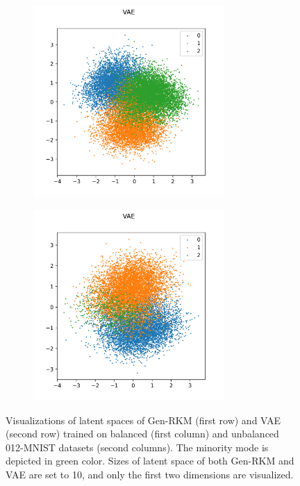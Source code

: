 \begin{figure}[H]
\begin{subfigure}{0.45\textwidth}
    \end{subfigure}
    \vfill
    \begin{subfigure}{0.45\textwidth}
        \centering
        \includegraphics[width=0.8\textwidth]{Figures/PS_v2/vae-bMNIST012-latentspace-vis.png} %
    \end{subfigure}
    \hfill
    \begin{subfigure}{0.45\textwidth}
        \centering
        \includegraphics[width=0.8\textwidth]{Figures/PS_v2/vae-ubMNIST012-latentspace-vis.png} %
    \end{subfigure}
    \caption{Visualizations of latent spaces of Gen-RKM (first row) and VAE (second row) trained on balanced (first column) and unbalanced 012-MNIST datasets (second columns). The minority mode is depicted in green color. Sizes of latent space of both Gen-RKM and VAE are set to 10, and only the first two dimensions are visualized.}
    \label{fig-latent-ub}
\end{figure}


